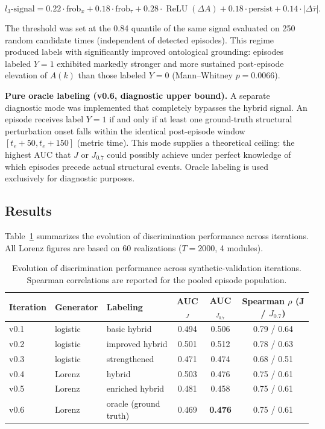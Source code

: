 \[
l_3\text{-signal} = 0.22 \cdot \text{frob}_x + 0.18 \cdot \text{frob}_\tau + 0.28 \cdot \operatorname{ReLU}(\Delta A) + 0.18 \cdot \text{persist} + 0.14 \cdot |\Delta \overline{\tau}|.
\]

The threshold was set at the 0.84 quantile of the same signal evaluated on 250 random candidate times (independent of detected episodes). This regime produced labels with significantly improved ontological grounding: episodes labeled \(Y=1\) exhibited markedly stronger and more sustained post-episode elevation of \(A(k)\) than those labeled \(Y=0\) (Mann--Whitney \(p = 0.0066\)).

\textbf{Pure oracle labeling (v0.6, diagnostic upper bound).} A separate diagnostic mode was implemented that completely bypasses the hybrid signal. An episode receives label \(Y=1\) if and only if at least one ground-truth structural perturbation onset falls within the identical post-episode window \([t_e + 50, t_e + 150]\) (metric time). This mode supplies a theoretical ceiling: the highest AUC that \(J\) or \(J_{0.7}\) could possibly achieve under perfect knowledge of which episodes precede actual structural events. Oracle labeling is used exclusively for diagnostic purposes.

\subsection{Results}

Table~\ref{tab:auc_evolution} summarizes the evolution of discrimination performance across iterations. All Lorenz figures are based on 60 realizations (\(T = 2000\), 4 modules).

\begin{table}[h]
\centering
\caption{Evolution of discrimination performance across synthetic-validation iterations. Spearman correlations are reported for the pooled episode population.}
\label{tab:auc_evolution}
\begin{tabular}{l l l c c c}
\toprule
Iteration & Generator & Labeling              & \multicolumn{1}{c}{AUC\(_J\)} & \multicolumn{1}{c}{AUC\(_{J_{0.7}}\)} & Spearman \(\rho\) (J / \(J_{0.7}\)) \\
\midrule
v0.1      & logistic  & basic hybrid          & 0.494     & 0.506             & 0.79 / 0.64                           \\
v0.2      & logistic  & improved hybrid       & 0.501     & 0.512             & 0.78 / 0.63                           \\
v0.3      & logistic  & strengthened          & 0.471     & 0.474             & 0.68 / 0.51                           \\
v0.4      & Lorenz    & hybrid                & 0.503     & 0.476             & 0.75 / 0.61                           \\
v0.5      & Lorenz    & enriched hybrid       & 0.481     & 0.458             & 0.75 / 0.61                           \\
v0.6      & Lorenz    & oracle (ground truth) & 0.469     & \textbf{0.476}    & 0.75 / 0.61                           \\
\bottomrule
\end{tabular}
\end{table}

